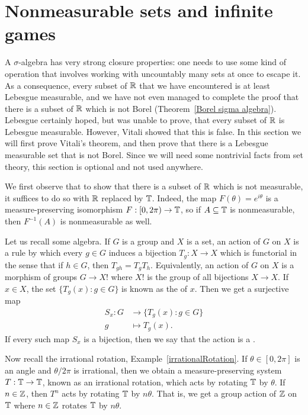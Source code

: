 \section{Nonmeasurable sets and infinite games}\label{nonmeasurable sets}
A $\sigma$-algebra has very strong closure properties: one needs to use some kind of operation that involves working with uncountably many sets at once to escape it.
As a consequence, every subset of $\mathbb{R}$ that we have encountered is at least Lebesgue measurable, and we have not even managed to complete the proof that there is a subset of $\mathbb{R}$ which is not Borel (Theorem~\ref{Borel sigma algebra}).
Lebesgue certainly hoped, but was unable to prove, that every subset of $\mathbb{R}$ is Lebesgue measurable.
However, Vitali showed that this is false. In this section we will first prove Vitali's theorem, and then prove that there is a Lebesgue measurable set that is not Borel.
Since we will need some nontrivial facts from set theory, this section is optional and not used anywhere.

\begin{subsec}
We first observe that to show that there is a subset of $\mathbb{R}$ which is not measurable, it suffices to do so with $\mathbb{R}$ replaced by $\mathbb{T}$.
Indeed, the map $F(\theta) = e^{i\theta}$ is a measure-preserving isomorphism $F: [0, 2\pi) \to \mathbb{T}$, so if $A \subseteq \mathbb{T}$ is nonmeasurable, then $F^{-1}(A)$ is nonmeasurable as well.
\end{subsec}

\begin{subsec}
Let us recall some algebra.
If $G$ is a group and $X$ is a set, an action of $G$ on $X$ is a rule by which every $g \in G$ induces a bijection $T_g: X \to X$ which is functorial in the sense that if $h \in G$, then $T_{gh} = T_gT_h$.
Equivalently, an action of $G$ on $X$ is a morphism of groups $G \to X!$ where $X!$ is the group of all bijections $X \to X$.
If $x \in X$, the set $\{T_g(x): g \in G\}$ is known as the  of $x$.
Then we get a surjective map
\begin{align*}
S_x: G &\to \{T_g(x): g \in G\}\\
g &\mapsto T_g(x).
\end{align*}
If every such map $S_x$ is a bijection, then we say that the action is a .
\end{subsec}

\begin{subsec}
Now recall the irrational rotation, Example~\ref{irrationalRotation}.
If $\theta \in [0, 2\pi]$ is an angle and $\theta/2\pi$ is irrational, then we obtain a measure-preserving system $T: \mathbb{T} \to \mathbb{T}$, known as an irrational rotation, which acts by rotating $\mathbb{T}$ by $\theta$.
If $n \in \mathbb{Z}$, then $T^n$ acts by rotating $\mathbb{T}$ by $n\theta$.
That is, we get a group action of $\mathbb{Z}$ on $\mathbb{T}$ where $n \in \mathbb{Z}$ rotates $\mathbb{T}$ by $n\theta$.
\end{subsec}

